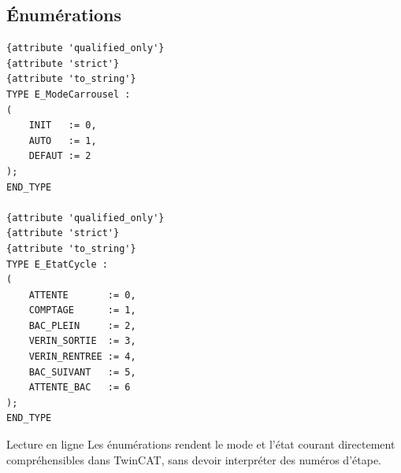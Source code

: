 
\noindent
\begin{minipage}[t]{0.47\textwidth}\vspace{0pt}
  \subsection{Énumérations}
\begin{lstlisting}[style=stcode]
{attribute 'qualified_only'}
{attribute 'strict'}
{attribute 'to_string'}
TYPE E_ModeCarrousel :
(
    INIT   := 0,
    AUTO   := 1,
    DEFAUT := 2
);
END_TYPE

{attribute 'qualified_only'}
{attribute 'strict'}
{attribute 'to_string'}
TYPE E_EtatCycle :
(
    ATTENTE       := 0,
    COMPTAGE      := 1,
    BAC_PLEIN     := 2,
    VERIN_SORTIE  := 3,
    VERIN_RENTREE := 4,
    BAC_SUIVANT   := 5,
    ATTENTE_BAC   := 6
);
END_TYPE
\end{lstlisting}

  \begin{notebox}{Lecture en ligne}
    Les énumérations rendent le mode et l'état courant directement compréhensibles dans TwinCAT, sans devoir interpréter des numéros d'étape.
  \end{notebox}
\end{minipage}\hfill
